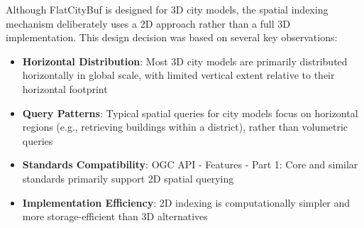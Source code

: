 Although FlatCityBuf is designed for 3D city models, the spatial indexing mechanism deliberately uses a 2D approach rather than a full 3D implementation. This design decision was based on several key observations:

\begin{itemize}
    \item \textbf{Horizontal Distribution}: Most 3D city models are primarily distributed horizontally in global scale, with limited vertical extent relative to their horizontal footprint
    \item \textbf{Query Patterns}: Typical spatial queries for city models focus on horizontal regions (e.g., retrieving buildings within a district), rather than volumetric queries
    \item \textbf{Standards Compatibility}: OGC API - Features - Part 1: Core \citep{ogc_api_2019} and similar standards primarily support 2D spatial querying
    \item \textbf{Implementation Efficiency}: 2D indexing is computationally simpler and more storage-efficient than 3D alternatives
\end{itemize}
